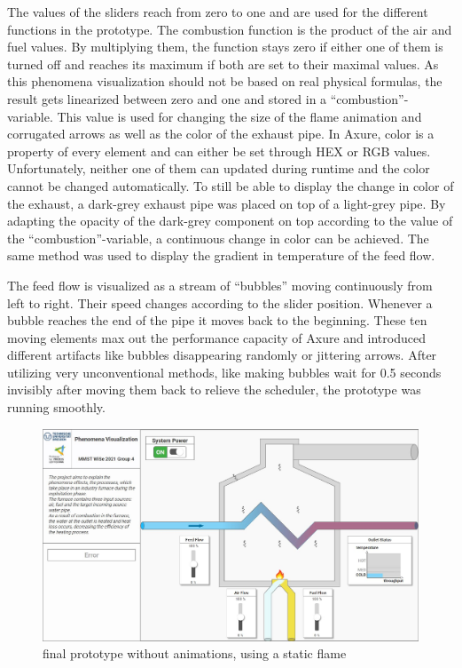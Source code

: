 The values of the sliders reach from zero to one and are used for the different functions in the prototype. The combustion function is the product of the air and fuel values. By multiplying them, the function stays zero if either one of them is turned off and reaches its maximum if both are set to their maximal values. As this phenomena visualization should not be based on real physical formulas, the result gets linearized between zero and one and stored in a “combustion”-variable. This value is used for changing the size of the flame animation and corrugated arrows as well as the color of the exhaust pipe. In Axure, color is a property of every element and can either be set through \ac{HEX} or \ac{RGB} values. Unfortunately, neither one of them can updated during runtime and the color cannot be changed automatically. To still be able to display the change in color of the exhaust, a dark-grey exhaust pipe was placed on top of a light-grey pipe. By adapting the opacity of the dark-grey component on top according to the value of the “combustion”-variable, a continuous change in color can be achieved. The same method was used to display the gradient in temperature of the feed flow.

The feed flow is visualized as a stream of “bubbles” moving continuously from left to right. Their speed changes according to the slider position. Whenever a bubble reaches the end of the pipe it moves back to the beginning. These ten moving elements max out the performance capacity of Axure and introduced different artifacts like bubbles disappearing randomly or jittering arrows. After utilizing very unconventional methods, like making bubbles wait for 0.5 seconds invisibly after moving them back to relieve the scheduler, the prototype was running smoothly.

\begin{figure}[htp]
    \centering
    \includegraphics[width=1\linewidth]{images/concept/prototype/prototype_final_woAnimation.JPG}
    \caption{final prototype without animations, using a static flame \cite{john3_free_fire_2019}}
\label{fig:axure_final_prototype_wo_animations}
\end{figure}

